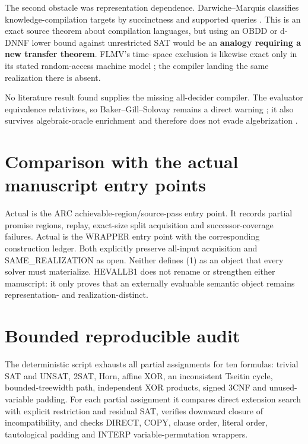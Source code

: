 \documentclass[11pt]{article}
\begin{document}
The second obstacle was representation dependence.  Darwiche--Marquis
classifies knowledge-compilation targets by succinctness and supported
queries \cite{DM02}.  This is an exact source theorem about compilation
languages, but using an OBDD or d-DNNF lower bound against unrestricted SAT
would be an \textbf{analogy requiring a new transfer theorem}.  FLMV's
time--space exclusion is likewise exact only in its stated random-access
machine model \cite{FLMV05}; the compiler landing the same realization there
is absent.

No literature result found supplies the missing all-decider compiler.
The evaluator equivalence relativizes, so Baker--Gill--Solovay remains a
direct warning \cite{BGS75}; it also survives algebraic-oracle enrichment and
therefore does not evade algebrization \cite{AW09}.

\section{Comparison with the actual manuscript entry points}

Actual  is the ARC achievable-region/source-pass entry point.
It records partial promise regions, replay, exact-size split acquisition and
successor-coverage failures.  Actual  is the WRAPPER entry
point with the corresponding construction ledger.  Both explicitly preserve
all-input acquisition and SAME\_REALIZATION as open.  Neither defines (1) as
an object that every solver must materialize.  HEVALLB1 does not rename or
strengthen either manuscript: it only proves that an externally evaluable
semantic object remains representation- and realization-distinct.

\section{Bounded reproducible audit}

The deterministic script
 exhausts
all partial assignments for ten formulas: trivial SAT and UNSAT, 2SAT, Horn,
affine XOR, an inconsistent Tseitin cycle, bounded-treewidth path, independent
XOR products, signed 3CNF and unused-variable padding.  For each partial
assignment it compares direct extension search with explicit restriction and
residual SAT, verifies downward closure of incompatibility, and checks
DIRECT, COPY, clause order, literal order, tautological padding and INTERP
variable-permutation wrappers.
\end{document}
